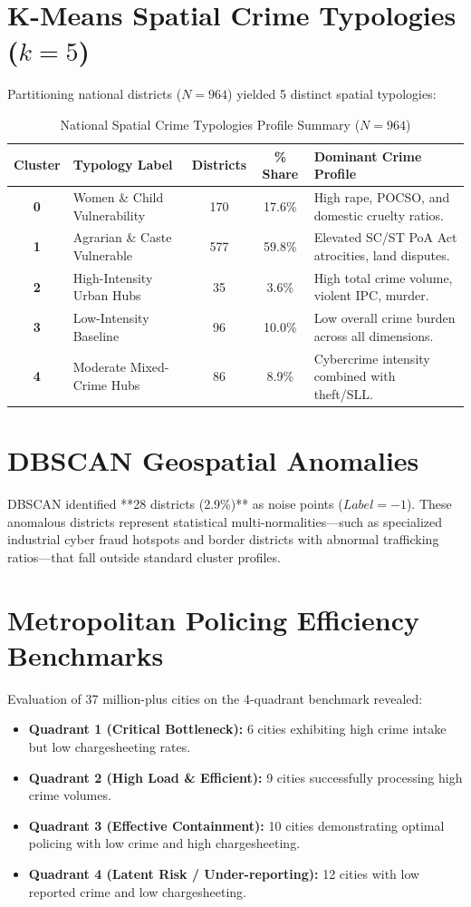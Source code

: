 \documentclass[12pt,a4paper]{report}
\begin{document}
\section{K-Means Spatial Crime Typologies ($k=5$)}
Partitioning national districts ($N=964$) yielded 5 distinct spatial typologies:
\begin{table}[h]
\centering
\small
\caption{National Spatial Crime Typologies Profile Summary ($N = 964$)}
\begin{tabular}{clccp{5.5cm}}
\toprule
\textbf{Cluster} & \textbf{Typology Label} & \textbf{Districts} & \textbf{\% Share} & \textbf{Dominant Crime Profile} \\
\midrule
\textbf{0} & Women \& Child Vulnerability & 170 & 17.6\% & High rape, POCSO, and domestic cruelty ratios. \\
\textbf{1} & Agrarian \& Caste Vulnerable & 577 & 59.8\% & Elevated SC/ST PoA Act atrocities, land disputes. \\
\textbf{2} & High-Intensity Urban Hubs & 35 & 3.6\% & High total crime volume, violent IPC, murder. \\
\textbf{3} & Low-Intensity Baseline & 96 & 10.0\% & Low overall crime burden across all dimensions. \\
\textbf{4} & Moderate Mixed-Crime Hubs & 86 & 8.9\% & Cybercrime intensity combined with theft/SLL. \\
\bottomrule
\end{tabular}
\end{table}

\section{DBSCAN Geospatial Anomalies}
DBSCAN identified **28 districts (2.9\%)** as noise points ($Label = -1$). These anomalous districts represent statistical multi-normalities—such as specialized industrial cyber fraud hotspots and border districts with abnormal trafficking ratios—that fall outside standard cluster profiles.

\section{Metropolitan Policing Efficiency Benchmarks}
Evaluation of 37 million-plus cities on the 4-quadrant benchmark revealed:
\begin{itemize}[leftmargin=*]
    \item \textbf{Quadrant 1 (Critical Bottleneck):} 6 cities exhibiting high crime intake but low chargesheeting rates.
    \item \textbf{Quadrant 2 (High Load \& Efficient):} 9 cities successfully processing high crime volumes.
    \item \textbf{Quadrant 3 (Effective Containment):} 10 cities demonstrating optimal policing with low crime and high chargesheeting.
    \item \textbf{Quadrant 4 (Latent Risk / Under-reporting):} 12 cities with low reported crime and low chargesheeting.
\end{itemize}
\end{document}
